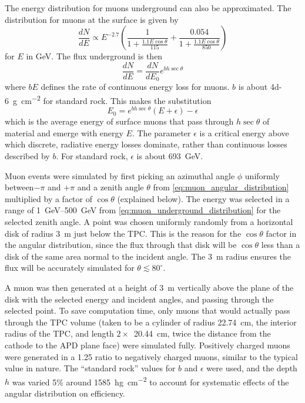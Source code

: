 \documentclass[herrin-thesis.tex]{subfiles}
\begin{document}
The energy distribution for muons underground can also be approximated\cite{Gaisser:1990kx}. The distribution for muons at the surface is given by
\begin{equation}
\label{eq:muon_surface_distribution}
\frac{dN}{dE} \propto E^{-2.7}\left(\frac{1}{1+\frac{1.1 E \cos \theta}{115}} + \frac{0.054}{1+\frac{1.1 E \cos \theta}{850}}\right)
\end{equation}
for \(E\) in \si{\GeV}. The flux underground is then
\begin{equation}
\label{eq:muon_underground_distribution}
\frac{dN}{dE} = \frac{dN}{dE_0}e^{b h \sec \theta}
\end{equation}
where \(b E\) defines the rate of continuous energy loss for muons. \(b\) is about \SI{4d-6}{\g\per\square\cm} for standard rock. This makes the substitution
\begin{equation}
\label{eq:muon_E0_def}
E_0 = e^{b h \sec \theta}\left(E + \epsilon\right) - \epsilon
\end{equation}
which is the average energy of surface muons that pass through \(h\sec\theta\) of material and emerge with energy \(E\). The parameter \(\epsilon\) is a critical energy above which discrete, radiative energy losses dominate, rather than continuous losses described by \(b\). For standard rock, \(\epsilon\) is about \SI{693}{\GeV}\cite{groom:2001ys}.

Muon events were simulated by first picking an azimuthal angle \(\phi\) uniformly between\(-\pi\) and \(+\pi\) and a zenith angle \(\theta\) from \cref{eq:muon_angular_distribution} multiplied by a factor of \(\cos\theta\) (explained below). The energy was selected in a range of \SIrange{1}{500}{\GeV} from \cref{eq:muon_underground_distribution} for the selected zenith angle. A point was chosen uniformly randomly from a horizontal disk of radius \SI{3}{\m} just below the TPC. This is the reason for the \(\cos\theta\) factor in the angular distribution, since the flux through that disk will be \(\cos\theta\) less than a disk of the same area normal to the incident angle. The \SI{3}{\m} radius ensures the flux will be accurately simulated for \(\theta \lesssim 80^{\circ}\).

A muon was then generated at a height of \SI{3}{\meter} vertically above the plane of the disk with the selected energy and incident angles, and passing through the selected point. To save computation time, only muons that would actually pass through the TPC volume (taken to be a cylinder of radius  \SI{22.74}{\cm}, the interior radius of the TPC, and length \(2\times\)~\SI{20.44}{\cm}, twice the distance from the cathode to the APD plane face) were simulated fully. Positively charged muons were generated in a 1.25 ratio to negatively charged muons, similar to the typical value in nature. The ``standard rock'' values for \(b\) and \(\epsilon\) were used, and the depth \(h\) was varied 5\% around \SI{1585}{\hecto\g\per\square\cm} to account for systematic effects of the angular distribution on efficiency.
\end{document}
